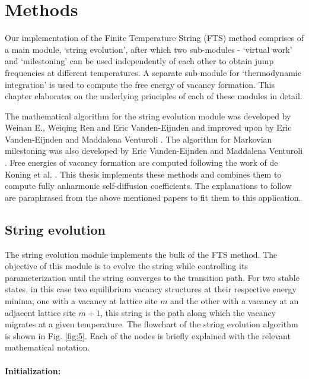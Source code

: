 \documentclass{article}
\begin{document}
\section{Methods}

Our implementation of the Finite Temperature String (FTS) method comprises of a main module, \enquote*{string evolution}, after which two sub-modules - \enquote*{virtual work} and \enquote*{milestoning} can be used independently of each other to obtain jump frequencies at different temperatures. A separate sub-module for \enquote*{thermodynamic integration} is used to compute the free energy of vacancy formation. This chapter elaborates on the underlying principles of each of these modules in detail.

The mathematical algorithm for the string evolution module was developed by Weinan E., Weiqing Ren and Eric Vanden-Eijnden \cite{Weinan2005} and improved upon by Eric Vanden-Eijnden and Maddalena Venturoli \cite{Vanden-Eijnden2009}. The algorithm for Markovian milestoning was also developed by Eric Vanden-Eijnden and Maddalena Venturoli \cite{Vanden-Eijnden2009a}. Free energies of vacancy formation are computed following the work of de Koning et al. \cite{deKoning}. This thesis implements these methods and combines them to compute fully anharmonic self-diffusion coefficients. The explanations to follow are paraphrased from the above mentioned papers to fit them to this application.

\subsection{String evolution} \label{string_evo}
\label{sec:3.1}

The string evolution module implements the bulk of the FTS method. The objective of this module is to evolve the string while controlling its parameterization until the string converges to the transition path. For two stable states, in this case two equilibrium vacancy structures at their respective energy minima, one with a vacancy at lattice site $m$ and the other with a vacancy at an adjacent lattice site $m+1$, this string is the path along which the vacancy migrates at a given temperature. The flowchart of the string evolution algorithm is shown in Fig. \ref{fig:5}. Each of the nodes is briefly explained with the relevant mathematical notation.

\paragraph*{Initialization:}
\end{document}
